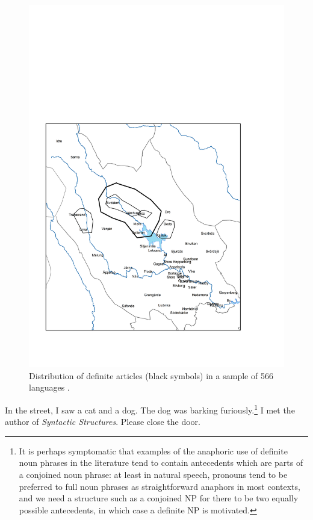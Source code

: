 \begin{figure}
\includegraphics{figures_mod/image8}
\caption{Distribution of definite articles (black symbols) in a sample of 566 languages \citep{Dryer2005}.}
\label{map:8}
\end{figure}
 


\ea 
	\gl	\label{bkm:Ref93745057}In the street, I saw a cat and a dog. The dog was barking furiously.\footnote{ It is perhaps symptomatic that examples of the anaphoric use of definite noun phrases in the literature tend to contain antecedents which are parts of a conjoined noun phrase: at least in natural speech, pronouns tend to be preferred to full noun phrases as straightforward anaphors in most contexts, and we need a structure such as a conjoined NP for there to be two equally possible antecedents, in which case a definite NP is motivated.}
\z 
\ea 
	\gl	\label{bkm:Ref93745078}I met the author of \textit{Syntactic Structures}.
\z 
\ea 
	\gl \label{bkm:Ref93745091}Please close the door. 
\z 

